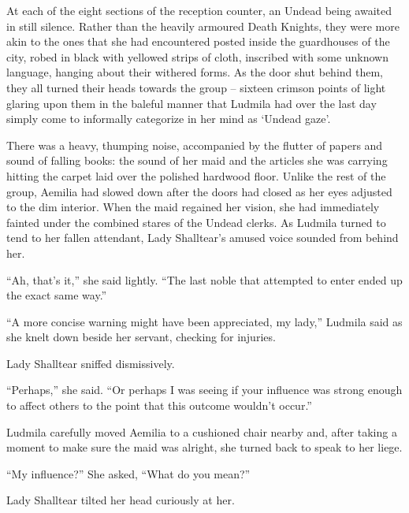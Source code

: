  

At each of the eight sections of the reception counter, an Undead being awaited in still silence. Rather than the heavily armoured Death Knights, they were more akin to the ones that she had encountered posted inside the guardhouses of the city, robed in black with yellowed strips of cloth, inscribed with some unknown language, hanging about their withered forms. As the door shut behind them, they all turned their heads towards the group – sixteen crimson points of light glaring upon them in the baleful manner that Ludmila had over the last day simply come to informally categorize in her mind as ‘Undead gaze’.

 

There was a heavy, thumping noise, accompanied by the flutter of papers and sound of falling books: the sound of her maid and the articles she was carrying hitting the carpet laid over the polished hardwood floor. Unlike the rest of the group, Aemilia had slowed down after the doors had closed as her eyes adjusted to the dim interior. When the maid regained her vision, she had immediately fainted under the combined stares of the Undead clerks. As Ludmila turned to tend to her fallen attendant, Lady Shalltear’s amused voice sounded from behind her.

 

“Ah, that’s it,” she said lightly. “The last noble that attempted to enter ended up the exact same way.”

 

“A more concise warning might have been appreciated, my lady,” Ludmila said as she knelt down beside her servant, checking for injuries.

 

Lady Shalltear sniffed dismissively.

 

“Perhaps,” she said. “Or perhaps I was seeing if your influence was strong enough to affect others to the point that this outcome wouldn’t occur.”

 

Ludmila carefully moved Aemilia to a cushioned chair nearby and, after taking a moment to make sure the maid was alright, she turned back to speak to her liege.

 

“My influence?” She asked, “What do you mean?”

 

Lady Shalltear tilted her head curiously at her.

